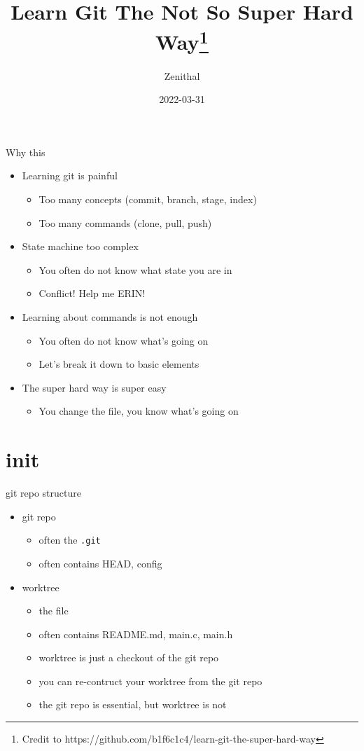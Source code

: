 \documentclass[aspectratio=169]{beamer}
\title[Learn Git]{Learn Git The Not So Super Hard Way\footnote{Credit to https://github.com/b1f6c1c4/learn-git-the-super-hard-way}}
\author[zenithal]{Zenithal}
\date{2022-03-31}
\newcommand{\T}[1]{\texttt{#1}}
\begin{document}
\begin{frame}
\titlepage
\end{frame}

\begin{frame}{Why this}
  \begin{itemize}
    \item<1-> Learning git is painful\begin{itemize}
      \item Too many concepts (commit, branch, stage, index)
      \item Too many commands (clone, pull, push)
    \end{itemize}
    \item<2-> State machine too complex\begin{itemize}
      \item You often do not know what state you are in 
      \item Conflict! Help me ERIN!
    \end{itemize}
    \item<3-> Learning about commands is not enough\begin{itemize}
      \item You often do not know what's going on
      \item Let's break it down to basic elements
    \end{itemize}
    \item<4-> The super hard way is super easy\begin{itemize}
      \item You change the file, you know what's going on
    \end{itemize}
  \end{itemize}
\end{frame}

\section{init}
\begin{frame}{git repo structure}
  \begin{itemize}
    \item git repo\begin{itemize}
      \item often the \T{.git}
      \item often contains HEAD, config
    \end{itemize}
    \item worktree\begin{itemize}
      \item the file
      \item often contains README.md, main.c, main.h
      \item worktree is just a checkout of the git repo
      \item you can re-contruct your worktree from the git repo
      \item the git repo is essential, but worktree is not
    \end{itemize}
  \end{itemize}
\end{frame}
\end{document}
